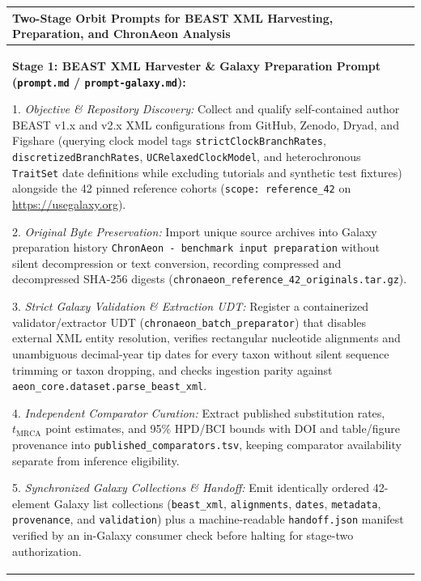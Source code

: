 \documentclass[11pt,letterpaper]{article}
\newcommand{\tool}[1]{\textsf{#1}}
\begin{document}
\begin{table}[!htbp]
\centering
\footnotesize
\begin{tabularx}{\textwidth}{X}
\toprule
\textbf{Two-Stage \tool{Orbit} Prompts for \tool{BEAST} XML Harvesting, Preparation, and \tool{ChronAeon} Analysis} \\
\midrule
\textbf{Stage 1: \tool{BEAST} XML Harvester \& Galaxy Preparation Prompt (\nolinkurl{prompt.md} / \nolinkurl{prompt-galaxy.md}):} \par\vspace{0.3em}
1. \textit{Objective \& Repository Discovery:} Collect and qualify self-contained author \tool{BEAST} v1.x and v2.x XML configurations from GitHub, Zenodo, Dryad, and Figshare (querying clock model tags \nolinkurl{strictClockBranchRates}, \nolinkurl{discretizedBranchRates}, \nolinkurl{UCRelaxedClockModel}, and heterochronous \texttt{TraitSet} date definitions while excluding tutorials and synthetic test fixtures) alongside the 42 pinned reference cohorts (\texttt{scope: reference\_42} on \url{https://usegalaxy.org}). \par
2. \textit{Original Byte Preservation:} Import unique source archives into Galaxy preparation history \texttt{ChronAeon - benchmark input preparation} without silent decompression or text conversion, recording compressed and decompressed SHA-256 digests (\nolinkurl{chronaeon_reference_42_originals.tar.gz}). \par
3. \textit{Strict Galaxy Validation \& Extraction UDT:} Register a containerized validator/extractor UDT (\nolinkurl{chronaeon_batch_preparator}) that disables external XML entity resolution, verifies rectangular nucleotide alignments and unambiguous decimal-year tip dates for every taxon without silent sequence trimming or taxon dropping, and checks ingestion parity against \nolinkurl{aeon_core.dataset.parse_beast_xml}. \par
4. \textit{Independent Comparator Curation:} Extract published substitution rates, $t_{\mathrm{MRCA}}$ point estimates, and 95\% HPD/BCI bounds with DOI and table/figure provenance into \nolinkurl{published_comparators.tsv}, keeping comparator availability separate from inference eligibility. \par
5. \textit{Synchronized Galaxy Collections \& Handoff:} Emit identically ordered 42-element Galaxy list collections (\texttt{beast\_xml}, \texttt{alignments}, \texttt{dates}, \texttt{metadata}, \texttt{provenance}, and \texttt{validation}) plus a machine-readable \nolinkurl{handoff.json} manifest verified by an in-Galaxy consumer check before halting for stage-two authorization. \par\vspace{0.5em}

\end{tabularx}
\end{table}
\end{document}
